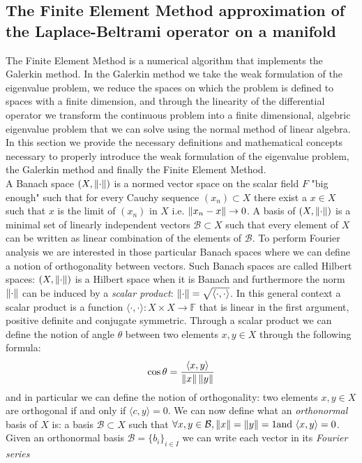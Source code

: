 \subsection{The Finite Element Method approximation of the Laplace-Beltrami operator on a manifold}\label{sec:Chapter3: Using the Finite Element Method to approximate the Laplace-Beltrami operator on a manifold}
The Finite Element Method is a numerical algorithm that implements the Galerkin method. In the Galerkin method we take the weak formulation of the eigenvalue problem, we reduce the spaces on which the problem is defined to spaces with a finite dimension, and through the linearity of the differential operator we transform the continuous problem into a finite dimensional, algebric eigenvalue problem that we can solve using the normal method of linear algebra. In this section we provide the necessary definitions and mathematical concepts necessary to properly introduce the weak formulation of the eigenvalue problem, the Galerkin method and finally the Finite Element Method. \\

A Banach space $(X, \left\lVert\cdot\right\rVert)$ is a normed vector space on the scalar field $F$ "big enough" such that for every Cauchy sequence $(x_n)\subset X$ there exist a $x\in X$ such that $x$ is the limit of $(x_n)$ in $X$ i.e. $\left\lVert x_n-x\right\rVert\rightarrow 0$. A basis of $(X, \left\lVert\cdot\right\rVert)$ is a minimal set of linearly independent vectors $\mathcal B \subset X$ such that every element of $X$ can be written as linear combination of the elements of $\mathcal B$. To perform Fourier analysis we are interested in those particular Banach spaces where we can define a notion of orthogonality between vectors. Such Banach spaces are called Hilbert spaces: $(X, \left\lVert\cdot\right\rVert )$ is a Hilbert space when it is Banach and furthermore the norm $ \left\lVert\cdot\right\rVert $ can be induced by a \textit{scalar product}: $\left\lVert\cdot\right\rVert = \sqrt{\langle\cdot,\cdot\rangle}$. In this general context a scalar product is a function $\langle\cdot,\cdot\rangle: X\times X \rightarrow \mathbb F$ that is linear in the first argument, positive definite and conjugate symmetric. Through a scalar product we can define the notion of angle $\theta$ between two elements $x, y \in X$ through the following formula: 
$$
\cos \theta = \frac{\langle x, y\rangle}{\left\lVert x\right\rVert \left\lVert y\right\rVert}
$$ 
and in particular we can define the notion of orthogonality: two elements  $x, y \in X$ are orthogonal if and only if $\langle c, y\rangle=0$. We can now define what an \textit{orthonormal} basis of $X$ is: a basis $\mathcal B \subset X$ such that $\forall x, y \in \mathcal B, \left\lVert x\right\rVert = \left\lVert y\right\rVert = 1 \text{and } \langle x, y\rangle = 0$. Given an orthonormal basis $\mathcal B = \{b_i\}_{i\in I}$ we can write each vector in its \textit{Fourier series} 

